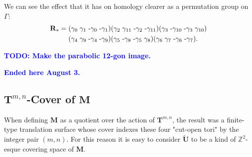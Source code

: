 \documentclass[]{article}
\newcommand{\compav}[1]{\textbf{\textcolor{blue}{#1}}}
\begin{document}
\vspace{2mm}
We can see the effect that it has on homology clearer as a permutation group on $\Gamma$:
\begin{align*}
\mathbf{R}_*= \hspace{1mm} &(\gamma_{0}\hspace{1mm}\gamma_{1}\hspace{1mm}\text{-}\gamma_{0}\hspace{1mm}\text{-}\gamma_{1})
(\gamma_{2}\hspace{1mm}\gamma_{11}\hspace{1mm}\text{-}\gamma_{2}\hspace{1mm}\text{-}\gamma_{11})
(\gamma_{3}\hspace{1mm}\text{-}\gamma_{10}\hspace{1mm}\text{-}\gamma_{3}\hspace{1mm}\gamma_{10})\\
&(\gamma_{4}\hspace{1mm}\gamma_{9}\hspace{1mm}\text{-}\gamma_{4}\hspace{1mm}\text{-}\gamma_{9})
(\gamma_{5}\hspace{1mm}\text{-}\gamma_{8}\hspace{1mm}\text{-}\gamma_{5}\hspace{1mm}\gamma_{8})
(\gamma_{6}\hspace{1mm}\gamma_{7}\hspace{1mm}\text{-}\gamma_{6}\hspace{1mm}\text{-}\gamma_{7}).
\end{align*}

\compav{TODO: Make the parabolic 12-gon image.}

\begin{figure}[H]
\centering

\end{figure}

\begin{figure}[H]
\centering

\end{figure}
\compav{Ended here August 3.}

\subsection{$\mathbf{T}^{m,n}$-Cover of $\mathbf M$}
When defining $\mathbf{M}$ as a quotient over the action of $\mathbf{T}^{m,n}$, the result was a finite-type translation surface whose cover indexes these four "cut-open tori" by the integer pair $(m,n)$. For this reason it is easy to consider $\tilde{\mathbf{U}}$ to be a kind of $\mathbb{Z}^2$-esque covering space of $\mathbf{M}$.
\end{document}
